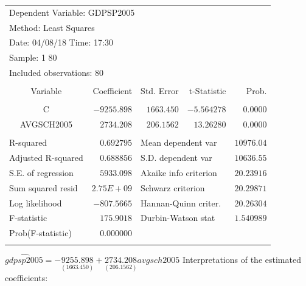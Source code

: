 \documentclass[12pt]{report}
\begin{document}
\begin{table}[H]
	\centering
	\begin{tabular}{lrrrr}
		\multicolumn{4}{l}{Dependent Variable: GDPSP2005}&\multicolumn{1}{c}{}\\
		\multicolumn{3}{l}{Method: Least Squares}&\multicolumn{1}{c}{}&\multicolumn{1}{c}{}\\
		\multicolumn{3}{l}{Date: 04/08/18   Time: 17:30}&\multicolumn{1}{c}{}&\multicolumn{1}{c}{}\\
		\multicolumn{2}{l}{Sample: 1 80}&\multicolumn{1}{c}{}&\multicolumn{1}{c}{}&\multicolumn{1}{c}{}\\
		\multicolumn{3}{l}{Included observations: 80}&\multicolumn{1}{c}{}&\multicolumn{1}{c}{}\\
		[4.5pt] \hline \\ [-4.5pt]
		\multicolumn{1}{c}{Variable}&\multicolumn{1}{r}{Coefficient}&\multicolumn{1}{r}{Std. Error}&\multicolumn{1}{r}{t-Statistic}&\multicolumn{1}{r}{Prob.}\\
		[4.5pt] \hline \\ [-4.5pt]
		\multicolumn{1}{c}{C}&\multicolumn{1}{r}{$-9255.898$}&\multicolumn{1}{r}{$1663.450$}&\multicolumn{1}{r}{$-5.564278$}&\multicolumn{1}{r}{$0.0000$}\\
		\multicolumn{1}{c}{AVGSCH2005}&\multicolumn{1}{r}{$2734.208$}&\multicolumn{1}{r}{$206.1562$}&\multicolumn{1}{r}{$13.26280$}&\multicolumn{1}{r}{$0.0000$}\\
		[4.5pt] \hline \\ [-4.5pt]
		\multicolumn{1}{l}{R-squared}&\multicolumn{1}{r}{$0.692795$}&\multicolumn{2}{l}{Mean dependent var}&\multicolumn{1}{r}{$10976.04$}\\
		\multicolumn{1}{l}{Adjusted R-squared}&\multicolumn{1}{r}{$0.688856$}&\multicolumn{2}{l}{S.D. dependent var}&\multicolumn{1}{r}{$10636.55$}\\
		\multicolumn{1}{l}{S.E. of regression}&\multicolumn{1}{r}{$5933.098$}&\multicolumn{2}{l}{Akaike info criterion}&\multicolumn{1}{r}{$20.23916$}\\
		\multicolumn{1}{l}{Sum squared resid}&\multicolumn{1}{r}{$2.75E+09$}&\multicolumn{2}{l}{Schwarz criterion}&\multicolumn{1}{r}{$20.29871$}\\
		\multicolumn{1}{l}{Log likelihood}&\multicolumn{1}{r}{$-807.5665$}&\multicolumn{2}{l}{Hannan-Quinn criter.}&\multicolumn{1}{r}{$20.26304$}\\
		\multicolumn{1}{l}{F-statistic}&\multicolumn{1}{r}{$175.9018$}&\multicolumn{2}{l}{Durbin-Watson stat}&\multicolumn{1}{r}{$1.540989$}\\
		\multicolumn{1}{l}{Prob(F-statistic)}&\multicolumn{1}{r}{$0.000000$}&\multicolumn{1}{c}{}&\multicolumn{1}{c}{}&\multicolumn{1}{c}{}\\
		[4.5pt] \hline \\ [-4.5pt]
	\end{tabular}
\end{table}
\vspace{-\baselineskip}
\centering $\widehat{gdpsp2005} = -\underset{(1663.450)}{9255.898} + \underset{(206.1562)}{2734.208}avgsch2005 $
\justify Interpretations of the estimated coefficients:
\end{document}
